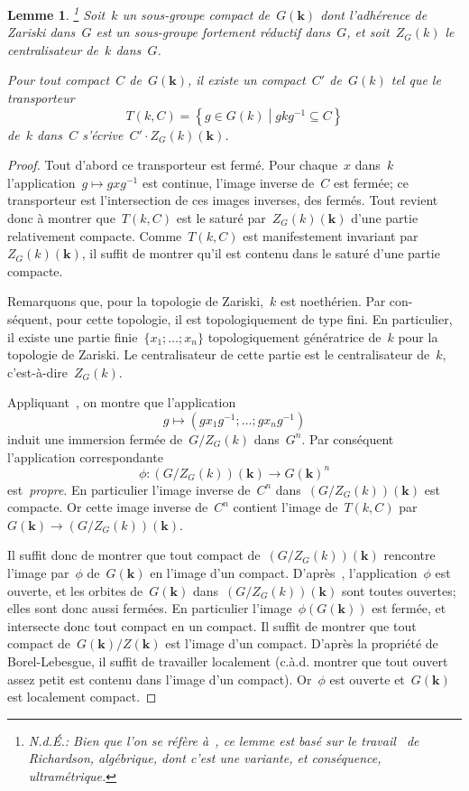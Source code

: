 \documentclass[french]{amsart}
\newcommand{\kk}{\mathbf{k}}
\newtheorem{lemme}{Lemme}[section]
\begin{document}
\begin{lemme}\label{LemmeF2}\label{lemmeF2}\footnote{N.d.É.: Bien que l'on se réfère à~\cite{PR94}, ce lemme est basé sur le travail~\cite{Richardson} de Richardson, algébrique, dont c'est une variante, et conséquence, ultramétrique.}
Soit~$k$ un sous-groupe compact de~$G(\kk)$ dont l'adhérence
de Zariski dans~$G$ est un sous-groupe fortement réductif dans~$G$,  et soit~$Z_G (k)$ le centralisateur de~$k$ dans~$G$.

Pour tout compact~$C$ de~$G(\kk)$, il existe un compact~$C'$ de~$G(k)$ tel que le transporteur
\begin{equation}
T (k, C) = \left\{g \in G(k)\middle|gkg^{-1} \subseteq C\right\}
\end{equation}
de~$k$ dans~$C$ s'écrive~$C'\cdot Z_G (k)(\kk)$.

\end{lemme}
\begin{proof}
 Tout d'abord ce transporteur est fermé. Pour chaque~$x$ dans~$k$ l'application~$g \mapsto g xg^{-1}$ est continue, l'image inverse de~$C$ est fermée; ce transporteur est l'intersection de ces images inverses, des fermés. Tout revient donc à montrer que~$T (k,C )$ est le
saturé par~$Z_G (k)(\kk)$ d'une partie relativement compacte. Comme~$T (k,C )$ est manifestement invariant par~$Z_G (k)(\kk)$, il suffit de montrer qu'il est contenu dans le saturé d'une partie compacte.

Remarquons que, pour la topologie de Zariski,~$k$ est noethérien. Par con-
séquent, pour cette topologie, il est topologiquement de type fini. En particulier, il existe une partie finie~$\{x_1 ; \ldots ; x_n \}$ topologiquement génératrice de~$k$ pour la topologie de Zariski. Le centralisateur de cette partie est le centralisateur de~$k$, c'est-à-dire~$Z_G (k)$.

Appliquant~\cite[Theorem 16.4]{Richardson}, on montre que l'application
\[
g\mapsto (gx_1g^{-1};\ldots;gx_ng^{-1})
\]
induit une immersion fermée de~$G/Z_G(k)$ dans~$G^n$. Par conséquent l'application correspondante
\[
\phi:\left(G/Z_G(k)\right)(\kk)\to G(\kk)^n
\]
est~\emph{propre}. En particulier l'image inverse de~$C^n$ dans~$\left(G/Z_G(k)\right)(\kk)$ est compacte. Or cette image inverse de~$C^n$ contient l'image de~$T(k,C)$ par~$G(\kk)\to\left(G/Z_G(k)\right)(\kk)$.

Il suffit donc de montrer que tout compact de~$\left(G/Z_G(k)\right)(\kk)$ rencontre l'image par~$\phi$ de~$G(\kk)$ en l'image d'un compact. D'après~\cite{PR94}, l'application~$\phi$ est ouverte, et les orbites de~$G(\kk)$ dans~$\left(G/Z_G(k)\right)(\kk)$ sont toutes ouvertes; elles sont donc aussi fermées. En particulier l'image~$\phi(G(\kk))$ est fermée, et intersecte donc tout compact en un compact. Il suffit de montrer que tout compact de~$G(\kk)/Z(\kk)$ est l'image d'un compact. D'après la propriété de Borel-Lebesgue, il suffit de travailler localement (c.à.d. montrer que tout ouvert assez petit est contenu dans l'image d'un compact). Or~$\phi$ est ouverte et~$G(\kk)$ est localement compact.
\end{proof}
\end{document}
